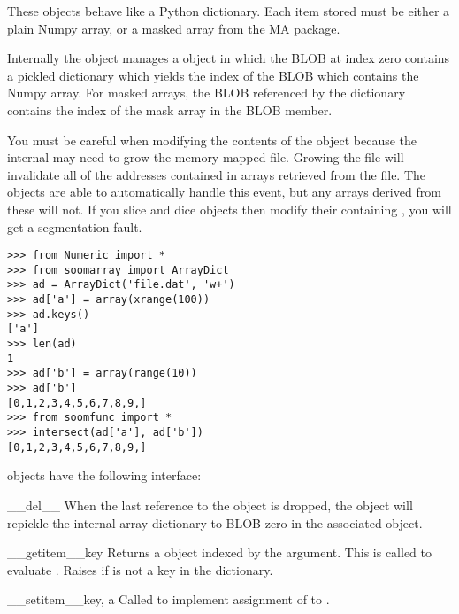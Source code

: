 These objects behave like a Python dictionary.  Each item stored must
be either a plain Numpy array, or a masked array from the MA package.

Internally the object manages a  object in which the
BLOB at index zero contains a pickled dictionary which yields the
index of the BLOB which contains the Numpy array.  For masked arrays,
the BLOB referenced by the dictionary contains the index of the mask
array in the  BLOB member.

You must be careful when modifying the contents of the
 object because the internal  may
need to grow the memory mapped file.  Growing the file will invalidate
all of the addresses contained in arrays retrieved from the file.  The
 objects are able to automatically handle this event,
but any arrays derived from these will not.  If you slice and dice
 objects then modify their containing
, you will get a segmentation fault.

\begin{verbatim}
>>> from Numeric import *
>>> from soomarray import ArrayDict 
>>> ad = ArrayDict('file.dat', 'w+')
>>> ad['a'] = array(xrange(100))
>>> ad.keys()
['a']
>>> len(ad) 
1
>>> ad['b'] = array(range(10))
>>> ad['b']
[0,1,2,3,4,5,6,7,8,9,]
>>> from soomfunc import *
>>> intersect(ad['a'], ad['b']) 
[0,1,2,3,4,5,6,7,8,9,]
\end{verbatim}

 objects have the following interface:

\begin{methoddesc}[ArrayDict]{__del__}{}
When the last reference to the object is dropped, the object will
repickle the internal array dictionary to BLOB zero in the associated
 object.
\end{methoddesc}

\begin{methoddesc}[ArrayDict]{__getitem__}{key}
Returns a  object indexed by the  argument.
This is called to evaluate .  Raises
 if  is not a key in the dictionary.
\end{methoddesc}

\begin{methoddesc}[ArrayDict]{__setitem__}{key, a}
Called to implement assignment of  to .
\end{methoddesc}

